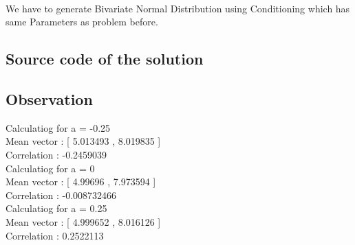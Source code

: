 \documentclass{article}
\begin{document}
	    \paragraph{}
		We have to generate Bivariate Normal Distribution using Conditioning which has same Parameters as problem before.

			
		
	\subsection{Source code of the solution}			                       
		
		\pagebreak
		\clearpage
		
		\subsection{Observation}
		
Calculatiog for a =  -0.25 \\
Mean vector : [ 5.013493  ,  8.019835 ]\\
Correlation :  -0.2459039 \\

Calculatiog for a =  0 \\
Mean vector : [ 4.99696  ,  7.973594 ]\\
Correlation :  -0.008732466 \\

Calculatiog for a =  0.25 \\
Mean vector : [ 4.999652  ,  8.016126 ]\\
Correlation :  0.2522113\\
		

		
\end{document}
